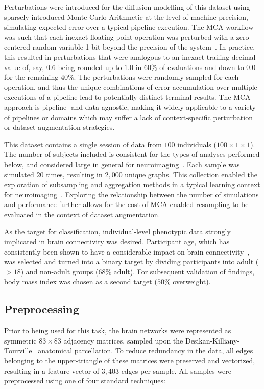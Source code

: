 \documentclass[10pt]{SelfArx} %
\newcommand{\new}[1]{\color{blue}#1\color{black}\xspace}
\begin{document}
\new{Perturbations were} introduced for \new{the diffusion modelling} of this dataset \new{using sparsely-introduced
Monte Carlo Arithmetic} at the level of machine-precision, simulating expected error over a typical pipeline execution.
\new{The MCA workflow was such that each inexact floating-point operation was perturbed with a zero-centered random
variable 1-bit beyond the precision of the system~\cite{Denis2016-wo,Parker1997-qq}. In practice, this resulted in
perturbations that were analogous to an inexact trailing decimal value of, say, $0.6$ being rounded up to $1.0$ in
$60\%$ of evaluations and down to $0.0$ for the remaining $40\%$. The perturbations were randomly sampled for each
operation, and thus the unique combinations of error accumulation over multiple executions of a pipeline lead to
potentially distinct terminal results. The MCA approach is pipeline- and data-agnostic, making it widely applicable to
a variety of pipelines or domains which may suffer a lack of context-specific perturbation or dataset augmentation
strategies.}

This dataset contains a single session of data from $100$ individuals ($100\times 1 \times1$). \new{The number of
subjects included is consistent for the types of analyses performed below, and considered large in general for
neuroimaging~\cite{neuroimagingsamplesize}.} Each sample was simulated $20$ times, resulting in $2,000$ unique graphs.
This collection enabled the exploration of subsampling and aggregation methods in a typical learning context for
neuroimaging~\cite{Dimitriadis2017-pd,Buchanan2014-pm}. Exploring the relationship between the number of simulations
and performance further allows for the cost of MCA-enabled resampling to be evaluated \new{in the context of} dataset
augmentation.

As the target for classification, individual-level phenotypic data strongly implicated in brain connectivity was
desired. Participant age, which has consistently been shown to have a considerable impact on brain
connectivity~\cite{Meier2012-ve,Wu2012-uc,Bookheimer2019-ti,Zhao2015-rm}, was selected and turned into a binary target
by dividing participants into adult ($>18$) and non-adult groups ($68\%$ adult). \new{For subsequent validation of
findings, body mass index was chosen as a second target ($50\%$ overweight).}

\subsection*{Preprocessing}
Prior to being used for this task, the brain networks were represented as symmetric $83 \times 83$ adjacency
matrices, sampled upon the Desikan-Killiany-Tourville~\cite{Klein2012-vi} anatomical parcellation. To reduce redundancy
in the data, all edges belonging to the upper-triangle of these matrices were preserved and vectorized, resulting in a
feature vector of $3,403$ edges per sample. All samples were preprocessed using one of four standard techniques:
\end{document}
